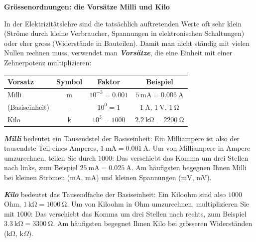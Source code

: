 \documentclass[addpoints,11pt,a4paper]{exam}
\newenvironment{theoriebox}[1][Theorie]{%
  \par\addvspace{10pt}\noindent\textbf{#1}\par\smallskip\noindent
}{%
  \par\addvspace{10pt}
}
\begin{document}
\needspace{10cm}
\begin{theoriebox}[Grössenordnungen: die Vorsätze Milli und Kilo]
In der Elektrizitätslehre sind die tatsächlich auftretenden Werte oft sehr
klein (Ströme durch kleine Verbraucher, Spannungen in elektronischen
Schaltungen) oder eher gross (Widerstände in Bauteilen). Damit man nicht
ständig mit vielen Nullen rechnen muss, verwendet man
\textbf{\emph{Vorsätze}}, die eine Einheit mit einer Zehnerpotenz
multiplizieren:

\begin{center}
\begin{tabular}{lccc}
\toprule
Vorsatz & Symbol & Faktor & Beispiel \\
\midrule
Milli & m & $10^{-3} = 0.001$ & $\SI{5}{\milli\ampere} = \SI{0.005}{\ampere}$ \\
(Basiseinheit) & -- & $10^{0} = 1$ & $\SI{1}{\ampere}$, $\SI{1}{\volt}$, $\SI{1}{\ohm}$ \\
Kilo & k & $10^{3} = 1000$ & $\SI{2.2}{\kilo\ohm} = \SI{2200}{\ohm}$ \\
\bottomrule
\end{tabular}
\end{center}

\textbf{\emph{Milli}} bedeutet ein Tausendstel der Basiseinheit: Ein
Milliampere ist also der tausendste Teil eines Amperes,
$\SI{1}{\milli\ampere} = \SI{0.001}{\ampere}$. Um von Milliampere in
Ampere umzurechnen, teilen Sie durch $1000$: Das verschiebt das Komma um
drei Stellen nach links, zum Beispiel
$\SI{25}{\milli\ampere} = \SI{0.025}{\ampere}$. Am häufigsten begegnen
Ihnen Milli bei kleinen Strömen ($\si{\milli\ampere}$, mA) und kleinen
Spannungen ($\si{\milli\volt}$, mV).

\textbf{\emph{Kilo}} bedeutet das Tausendfache der Basiseinheit: Ein
Kiloohm sind also $1000$ Ohm, $\SI{1}{\kilo\ohm} = \SI{1000}{\ohm}$. Um
von Kiloohm in Ohm umzurechnen, multiplizieren Sie mit $1000$: Das
verschiebt das Komma um drei Stellen nach rechts, zum Beispiel
$\SI{3.3}{\kilo\ohm} = \SI{3300}{\ohm}$. Am häufigsten begegnet Ihnen
Kilo bei grösseren Widerständen ($\si{\kilo\ohm}$, k$\Omega$).
\end{theoriebox}
\end{document}

